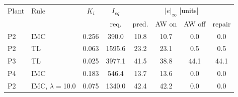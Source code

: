 \begin{tabular}{@{}llcccccc@{}}
\toprule
Plant & Rule & $K_i$ & $I_{eq}$ & \multicolumn{4}{c}{$|e|_\infty$ [units]} \\
 & & & req. & pred. & AW on & AW off & repair \\
\midrule
P2 & IMC & 0.256 & 390.0 & 10.8 & 10.7 & 0.0 & 0.0 \\
P2 & TL & 0.063 & 1595.6 & 23.2 & 23.1 & 0.5 & 0.5 \\
P3 & TL & 0.025 & 3977.1 & 41.5 & 38.8 & 44.1 & 44.1 \\
P4 & IMC & 0.183 & 546.4 & 13.7 & 13.6 & 0.0 & 0.0 \\
P2 & IMC, $\lambda{=}$10.0 & 0.075 & 1340.0 & 42.4 & 42.2 & 0.0 & 0.0 \\
\bottomrule
\end{tabular}
